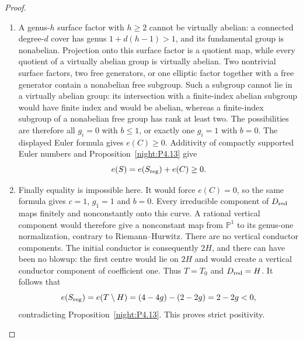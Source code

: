 \begin{proof}
\begin{enumerate}[label={$\langle1\rangle$\arabic*.},leftmargin=*]
\item A genus-$h$ surface factor with $h\ge2$ cannot be virtually
abelian: a connected degree-$d$ cover has genus $1+d(h-1)>1$,
and its fundamental group is nonabelian. Projection onto this
surface factor is a quotient map, while every quotient of a
virtually abelian group is virtually abelian. Two nontrivial surface factors,
two free generators, or one elliptic factor together
with a free generator contain a nonabelian free
subgroup. Such a subgroup cannot lie in a virtually
abelian group: its intersection with a finite-index
abelian subgroup would have finite index and would
be abelian, whereas a finite-index subgroup of a
nonabelian free group has rank at least two. The
possibilities are therefore all $g_i=0$ with
$b\le1$, or exactly one $g_i=1$ with $b=0$.
The displayed Euler formula gives $e(C)\ge0$.
Additivity of compactly supported Euler numbers and
Proposition~\ref{night:P4.13} give
\[
 e(S)=e(S_{\rm reg})+e(C)\ge0.
\]

\item Finally equality is impossible here. It would force
$e(C)=0$, so the same formula gives $c=1$, $g_1=1$
and $b=0$. Every irreducible component of
$D_{\rm red}$ maps finitely and nonconstantly onto
this curve. A rational vertical component would
therefore give a nonconstant map from $\mathbb P^1$
to its genus-one normalization, contrary to
Riemann--Hurwitz. There are no vertical conductor
components. The initial conductor is consequently
$2H$, and there can have been no blowup: the first
centre would lie on $2H$ and would create a vertical
conductor component of coefficient one. Thus
$T=T_0$ and $D_{\rm red}=H$. It follows that
\[
 e(S_{\rm reg})=e(T\setminus H)
       =(4-4g)-(2-2g)=2-2g<0,
\]
contradicting Proposition~\ref{night:P4.13}. This proves strict positivity.

\end{enumerate}
\end{proof}